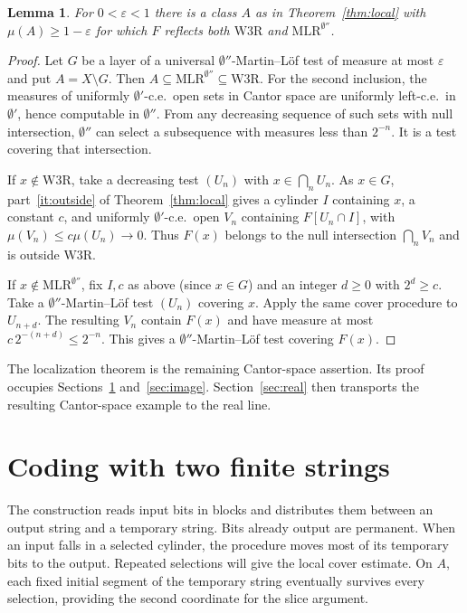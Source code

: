\documentclass[12pt,reqno]{amsart}
\newtheorem{lemma}[theorem]{Lemma}
\newcommand{\WThree}{\mathrm{W3R}}
\newcommand{\MLR}{\mathrm{MLR}}
\newcommand{\mass}{\mu}
\newcommand{\eps}{\varepsilon}
\newcommand{\jump}{\emptyset'}
\newcommand{\djump}{\emptyset''}
\begin{document}
\begin{lemma}\label{lem:reflection}
For $0<\eps<1$ there is a class $A$ as in Theorem~\ref{thm:local} with
$\mass(A)\ge1-\eps$ for which $F$ reflects both $\WThree$ and $\MLR^{\djump}$.
\end{lemma}
\begin{proof}
Let $G$ be a layer of a universal $\djump$-Martin--L\"of test of measure
at most $\eps$ and put $A=X\setminus G$. Then $A\subseteq\MLR^{\djump}
\subseteq\WThree$. For the second inclusion, the measures of uniformly
$\jump$-c.e.\ open sets in Cantor space are uniformly left-c.e.\ in
$\jump$, hence computable in $\djump$. From any decreasing sequence of
such sets with null intersection, $\djump$ can select a subsequence with
measures less than $2^{-n}$. It is a test covering that intersection.

If $x\notin\WThree$, take a decreasing test $(U_n)$ with $x\in\bigcap_n U_n$.
As $x\in G$, part~\eqref{it:outside} of Theorem~\ref{thm:local} gives a cylinder $I$ containing $x$, a constant $c$, and
uniformly $\jump$-c.e.\ open $V_n$ containing $F[U_n\cap I]$, with
$\mass(V_n)\le c\mass(U_n)\to0$. Thus $F(x)$ belongs to the null
intersection $\bigcap_n V_n$ and is outside $\WThree$.

If $x\notin\MLR^{\djump}$, fix $I,c$ as above (since $x\in G$) and an integer $d\ge0$ with $2^d\ge c$. Take a
$\djump$-Martin--L\"of test $(U_n)$ covering $x$. Apply the same cover procedure
to $U_{n+d}$. The resulting $V_n$ contain $F(x)$ and have measure at
most $c\,2^{-(n+d)}\le2^{-n}$. This gives a $\djump$-Martin--L\"of test
covering $F(x)$.
\end{proof}

The localization theorem is the remaining Cantor-space assertion. Its proof occupies
Sections~\ref{sec:code} and~\ref{sec:image}. Section~\ref{sec:real}
then transports the resulting Cantor-space example to the real line.

\section{Coding with two finite strings}\label{sec:code}
The construction reads input bits in blocks and distributes them between
an output string and a temporary string. Bits already output are permanent.
When an input falls in a selected cylinder, the procedure moves most of
its temporary bits to the output. Repeated selections will give the local
cover estimate. On $A$, each fixed initial segment of the temporary string
eventually survives every selection, providing the second coordinate for
the slice argument.
\end{document}
